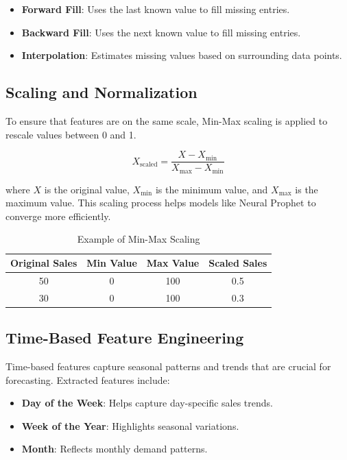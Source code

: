 \begin{itemize}
    \item \textbf{Forward Fill}: Uses the last known value to fill missing entries.
    \item \textbf{Backward Fill}: Uses the next known value to fill missing entries.
    \item \textbf{Interpolation}: Estimates missing values based on surrounding data points.
\end{itemize}

\subsection*{Scaling and Normalization}

To ensure that features are on the same scale, Min-Max scaling is applied to rescale values between 0 and 1.

\begin{equation}
    X_{\text{scaled}} = \frac{X - X_{\text{min}}}{X_{\text{max}} - X_{\text{min}}}
\end{equation}

where \( X \) is the original value, \( X_{\text{min}} \) is the minimum value, and \( X_{\text{max}} \) is the maximum value. This scaling process helps models like Neural Prophet to converge more efficiently.

\begin{table}[H]
\centering
\caption{Example of Min-Max Scaling}
\begin{tabular}{|c|c|c|c|}
\hline
\textbf{Original Sales} & \textbf{Min Value} & \textbf{Max Value} & \textbf{Scaled Sales} \\ \hline
50 & 0 & 100 & 0.5 \\ \hline
30 & 0 & 100 & 0.3 \\ \hline
\end{tabular}
\end{table}

\subsection*{Time-Based Feature Engineering}

Time-based features capture seasonal patterns and trends that are crucial for forecasting. Extracted features include:

\begin{itemize}
    \item \textbf{Day of the Week}: Helps capture day-specific sales trends.
    \item \textbf{Week of the Year}: Highlights seasonal variations.
    \item \textbf{Month}: Reflects monthly demand patterns.
\end{itemize}

